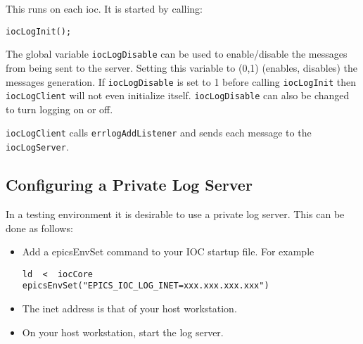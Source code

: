 This runs on each ioc.
It is started by calling:

\begin{verbatim}
iocLogInit();
\end{verbatim}

The global variable \verb|iocLogDisable| can be used to enable/disable the messages from being sent to the server.
Setting this variable to (0,1) (enables, disables) the messages generation.
If \verb|iocLogDisable| is set to 1 before calling \verb|iocLogInit| then \verb|iocLogClient| will not even initialize itself.
\verb|iocLogDisable| can also be changed to turn logging on or off.

\verb|iocLogClient| calls \verb|errlogAddListener| and sends each message to the \verb|iocLogServer|.

\subsection{Configuring a Private Log Server}

In a testing environment it is desirable to use a private log server.
This can be done as follows:

\begin{itemize}

\item Add a epicsEnvSet command to your IOC startup file.
For example

\begin{verbatim}
ld  <  iocCore
epicsEnvSet("EPICS_IOC_LOG_INET=xxx.xxx.xxx.xxx")
\end{verbatim}

\item The inet address is that of your host workstation.

\item On your host workstation, start the log server.

\end{itemize}
